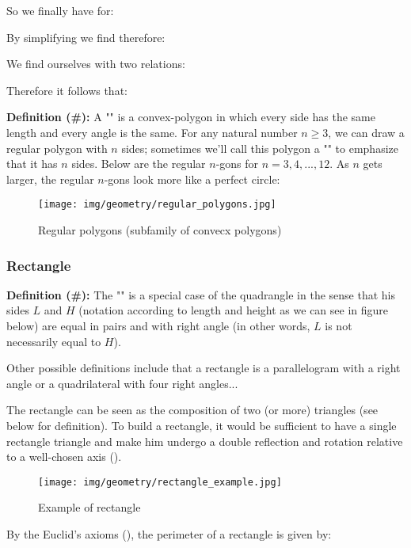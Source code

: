 {	So we finally have for:
	
	By simplifying we find therefore:
	
	We find ourselves with two relations:
	
	Therefore it follows that:
	
	
	\textbf{Definition (\#\mydef):} A "" is a convex-polygon in which every side has the same length and every angle is the same. For any natural number $n\geq 3$, we can draw a regular polygon with $n$ sides; sometimes we'll call this polygon a "" to emphasize that it has $n$ sides. Below are the regular $n$-gons for $n = 3, 4, ..., 12$. As $n$ gets larger, the regular $n$-gons look more like a perfect circle:
	\begin{figure}[H]
	\centering
		\texttt{[image: img/geometry/regular\_polygons.jpg]}
	\caption{Regular polygons (subfamily of convecx polygons)}
	\end{figure}
	
	\subsubsection{Rectangle}
	\textbf{Definition (\#\mydef):} The "" is a special case of the quadrangle in the sense that his sides $L$ and $H$ (notation according to length and height as we can see in figure below) are equal in pairs and with right angle (in other words, $L$ is not necessarily equal to $H$).
	
	Other possible definitions include that a rectangle is a parallelogram with a right angle or a quadrilateral with four right angles...
	
	\begin{tcolorbox}[title=Remark,colframe=black,arc=10pt]
	The rectangle can be seen as the composition of two (or more) triangles (see below for definition). To build a rectangle, it would be sufficient to have a single rectangle triangle and make him undergo a double reflection and rotation relative to a well-chosen axis ().
	\end{tcolorbox}
	
	\begin{figure}[H]
		\centering
		\texttt{[image: img/geometry/rectangle\_example.jpg]}
		\caption{Example of rectangle}
	\end{figure}
	By the Euclid's axioms (), the perimeter of a rectangle is given by:
	
}

